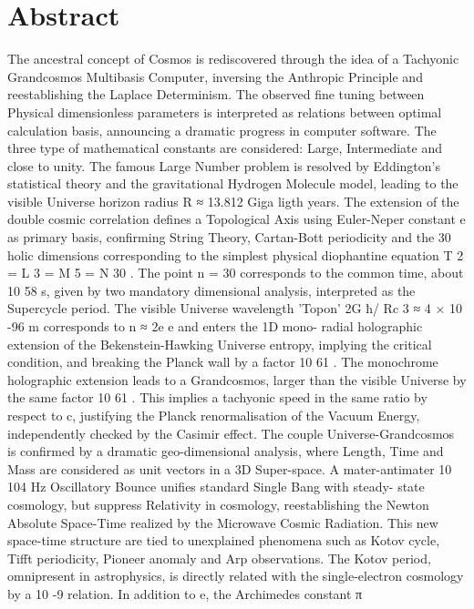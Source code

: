 
\chapter*{Abstract}
\vspace{-40pt}
The ancestral concept of Cosmos is rediscovered through the idea of a Tachyonic
Grandcosmos Multibasis Computer, inversing the Anthropic Principle and reestablishing
the Laplace Determinism. The observed fine tuning between Physical dimensionless
parameters is interpreted as relations between optimal calculation basis, announcing a
dramatic progress in computer software. The three type of mathematical constants are
considered: Large, Intermediate and close to unity. The famous Large Number problem is
resolved by Eddington's statistical theory and the gravitational Hydrogen Molecule model,
leading to the visible Universe horizon radius R ≈ 13.812 Giga ligth years. The extension of
the double cosmic correlation defines a Topological Axis using Euler-Neper constant e as
primary basis, confirming String Theory, Cartan-Bott periodicity and the 30 holic
dimensions corresponding to the simplest physical diophantine equation T 2 = L 3 = M 5 =
N 30 . The point n = 30 corresponds to the common time, about 10 58 s, given by two
mandatory dimensional analysis, interpreted as the Supercycle period. The visible Universe
wavelength 'Topon' 2G ħ/ Rc 3 ≈ 4 × 10 -96 m corresponds to n ≈ 2e e and enters the 1D mono-
radial holographic extension of the Bekenstein-Hawking Universe entropy, implying the
critical condition, and breaking the Planck wall by a factor 10 61 . The monochrome
holographic extension leads to a Grandcosmos, larger than the visible Universe by the
same factor 10 61 . This implies a tachyonic speed in the same ratio by respect to c, justifying
the Planck renormalisation of the Vacuum Energy, independently checked by the Casimir
effect. The couple Universe-Grandcosmos is confirmed by a dramatic geo-dimensional
analysis, where Length, Time and Mass are considered as unit vectors in a 3D Super-space.
A mater-antimater 10 104 Hz Oscillatory Bounce unifies standard Single Bang with steady-
state cosmology, but suppress Relativity in cosmology, reestablishing the Newton Absolute
Space-Time realized by the Microwave Cosmic Radiation. This new space-time structure are
tied to unexplained phenomena such as Kotov cycle, Tifft periodicity, Pioneer anomaly and
Arp observations. The Kotov period, omnipresent in astrophysics, is directly related with the
single-electron cosmology by a 10 -9 relation. In addition to e, the Archimedes constant π
